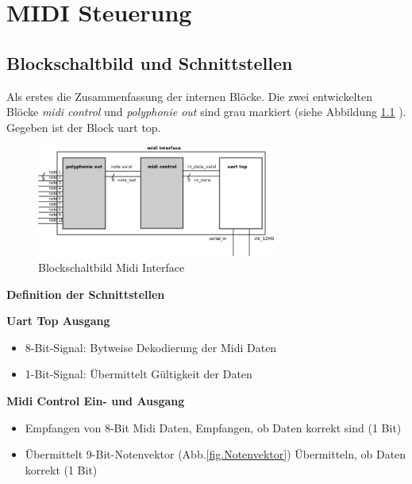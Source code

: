
\chapter{MIDI Steuerung}\label{chap.midi}

\section{Blockschaltbild und Schnittstellen}

Als erstes die Zusammenfassung der internen Blöcke. Die zwei entwickelten Blöcke \textit{midi control} und \textit{polyphonie out} sind grau markiert (siehe Abbildung \ref{fig.midi_interface_block} ). Gegeben ist der Block uart top. \\

\begin{figure}[H]
	\centering
	\includegraphics[width=0.7\textwidth]{images/midi_interface/midi_interface_block.png}
	\caption{Blockschaltbild Midi Interface}
	\label{fig.midi_interface_block}
\end{figure}


\textbf{Definition der Schnittstellen}\label{schnittstellen}

\textbf{Uart Top Ausgang}
\begin{itemize}
	\item 8-Bit-Signal: Bytweise Dekodierung der Midi Daten 
	\item 1-Bit-Signal: Übermittelt Gültigkeit der Daten
\end{itemize}

\textbf{Midi Control Ein- und Ausgang}
\begin{itemize}
	\item Empfangen von 8-Bit Midi Daten, \hspace*{20mm}Empfangen, ob Daten korrekt sind (1 Bit)
	\item Übermittelt 9-Bit-Notenvektor (Abb.\ref{fig.Notenvektor}) \hspace*{10mm}Übermitteln, ob Daten korrekt (1 Bit)
\end{itemize}


